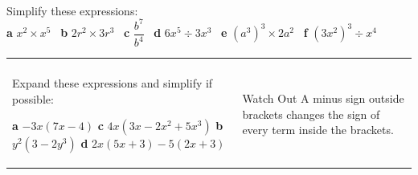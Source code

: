 \documentclass[fleqn, twoside]{article}
\begin{document}
\begin{examplebox}{}{}
    \\ %
    Simplify these expressions:\\
    \textbf{a}\hspace{2mm} $x^2 \times x^5$            \hspace{7mm} \
    \textbf{b}\hspace{2mm} $2r^2 \times 3r^3$         \hspace{7mm} \
    \textbf{c}\hspace{2mm} $\dfrac{b^7}{b^4}$         \hspace{7mm} \
    \textbf{d}\hspace{2mm} $6x^5 \div 3x^3$             \hspace{7mm} \
    \textbf{e}\hspace{2mm} $(a^3)^3 \times 2a^2$     \hspace{7mm} \
    \textbf{f}\hspace{2mm} $(3x^2)^3 \div x^4$
\end{examplebox}

\newpage




\begin{table}[!ht]
    \vspace{-4mm}
    \begin{tabularx}{\dimexpr\textwidth}{X@{\hskip6pt}p{2.5in}}
        \vspace{-5mm}
        \begin{examplebox}{}{}
            \\ %
            Expand these expressions and simplify if possible:
            \begin{multicols}{2}
                \textbf{a}\hspace{2mm} $-3x(7x-4)$          \newline
                \textbf{c}\hspace{2mm} $4x(3x-2x^2+5x^3)$
                \columnbreak
                \newline
                \textbf{b}\hspace{2mm} $y^2(3-2y^3)$        \newline
                \textbf{d}\hspace{2mm} $2x(5x+3)-5(2x+3)$
            \end{multicols}
        \end{examplebox} & \begin{note*}{Watch Out}{}
            A minus sign outside brackets changes the sign of every term inside the brackets.
        \end{note*}
    \end{tabularx} 
\end{table}
\vspace{8.5cm}
\end{document}
